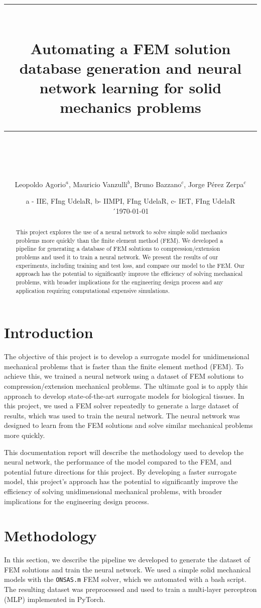 \documentclass[11pt]{scrartcl} %
\title{	
	\normalfont\normalsize
	\textsc{}\\ %
	\vspace{25pt} %
	\rule{\linewidth}{0.5pt}\\ %
	\vspace{20pt} %
	{\huge Automating a FEM solution database generation and neural network learning for solid mechanics problems}\\ %
	\vspace{12pt} %
	\rule{\linewidth}{2pt}\\ %
	\vspace{12pt} %
}
\author{\Large Leopoldo Agorio$^a$, Mauricio Vanzulli$^b$, Bruno Bazzano$^c$, Jorge Pérez Zerpa$^c$} %
\date{\small{a - IIE, FIng UdelaR, b- IIMPI, FIng UdelaR, c- IET, FIng UdelaR}\\[3mm]´\normalsize\today} %
\begin{document}
\maketitle %


\begin{abstract}
	This project explores the use of a neural network to solve simple solid mechanics problems more quickly than the finite element method (FEM). We developed a pipeline for generating a database of FEM solutions to compression/extension problems and used it to train a neural network. We present the results of our experiments, including training and test loss, and compare our model to the FEM. Our approach has the potential to significantly improve the efficiency of solving mechanical problems, with broader implications for the engineering design process and any application requiring computational expensive simulations.
\end{abstract}
\section{Introduction}
The objective of this project is to develop a surrogate model for unidimensional mechanical problems that is faster than the finite element method (FEM). To achieve this, we trained a neural network using a dataset of FEM solutions to compression/extension mechanical problems. The ultimate goal is to apply this approach to develop state-of-the-art surrogate models for biological tissues. In this project, we used a FEM solver repeatedly to generate a large dataset of results, which was used to train the neural network. The neural network was designed to learn from the FEM solutions and solve similar mechanical problems more quickly.

This documentation report will describe the methodology used to develop the neural network, the performance of the model compared to the FEM, and potential future directions for this project. By developing a faster surrogate model, this project's approach has the potential to significantly improve the efficiency of solving unidimensional mechanical problems, with broader implications for the engineering design process.

\section{Methodology}
In this section, we describe the pipeline we developed to generate the dataset of FEM solutions and train the neural network. We used a simple solid mechanical models with the \texttt{ONSAS.m} FEM solver, which we automated with a bash script. The resulting dataset was preprocessed and used to train a multi-layer perceptron (MLP) implemented in PyTorch.
\end{document}
